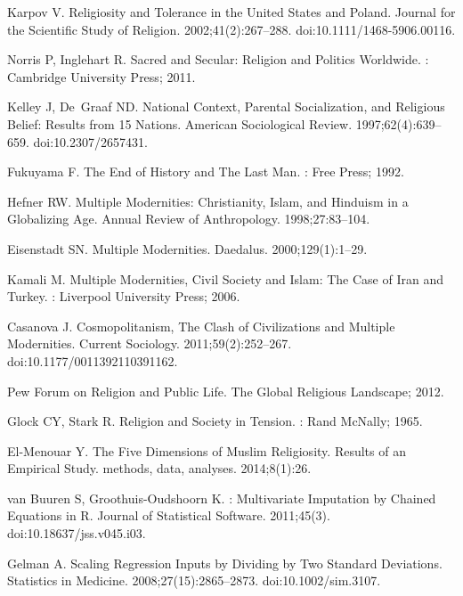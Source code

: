\documentclass[10pt,letterpaper]{article}
\begin{document}
\begin{thebibliography}{10}
Karpov V.
\newblock Religiosity and {{Tolerance}} in the {{United States}} and
  {{Poland}}.
\newblock Journal for the Scientific Study of Religion. 2002;41(2):267--288.
\newblock doi:{10.1111/1468-5906.00116}.

Norris P, Inglehart R.
\newblock Sacred and {{Secular}}: {{Religion}} and {{Politics Worldwide}}.
: {Cambridge University Press}; 2011.

Kelley J, De~Graaf ND.
\newblock National {{Context}}, {{Parental Socialization}}, and {{Religious
  Belief}}: {{Results}} from 15 {{Nations}}.
\newblock American Sociological Review. 1997;62(4):639--659.
\newblock doi:{10.2307/2657431}.

Fukuyama F.
\newblock The {{End}} of {{History}} and {{The Last Man}}.
: {Free Press}; 1992.

Hefner RW.
\newblock Multiple {{Modernities}}: {{Christianity}}, {{Islam}}, and
  {{Hinduism}} in a {{Globalizing Age}}.
\newblock Annual Review of Anthropology. 1998;27:83--104.

Eisenstadt SN.
\newblock Multiple {{Modernities}}.
\newblock Daedalus. 2000;129(1):1--29.

Kamali M.
\newblock Multiple {{Modernities}}, {{Civil Society}} and {{Islam}}: The
  {{Case}} of {{Iran}} and {{Turkey}}.
: {Liverpool University Press}; 2006.

Casanova J.
\newblock Cosmopolitanism, {{The Clash}} of {{Civilizations}} and {{Multiple
  Modernities}}.
\newblock Current Sociology. 2011;59(2):252--267.
\newblock doi:{10.1177/0011392110391162}.

{Pew Forum on Religion and Public Life}. The {{Global Religious Landscape}};
  2012.

Glock CY, Stark R.
\newblock Religion and {{Society}} in {{Tension}}.
: {Rand McNally}; 1965.

{El-Menouar} Y.
\newblock The Five Dimensions of {{Muslim}} Religiosity. {{Results}} of an
  Empirical Study.
\newblock methods, data, analyses. 2014;8(1):26.

van Buuren S, {Groothuis-Oudshoorn} K.
 : {{Multivariate Imputation}} by {{Chained Equations}} in
  {{R}}.
\newblock Journal of Statistical Software. 2011;45(3).
\newblock doi:{10.18637/jss.v045.i03}.

Gelman A.
\newblock Scaling {{Regression Inputs}} by {{Dividing}} by {{Two Standard
  Deviations}}.
\newblock Statistics in Medicine. 2008;27(15):2865--2873.
\newblock doi:{10.1002/sim.3107}.

\end{thebibliography}

%
\end{document}
